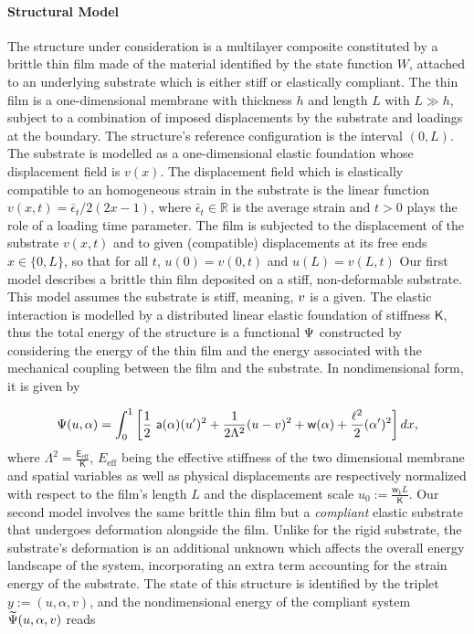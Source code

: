 \documentclass[10pt]{article}
\begin{document}
\paragraph{Structural Model}
The structure under consideration is a multilayer composite constituted by a brittle thin film  made of the material identified by the state function $W$, attached to an underlying substrate which is either {stiff} or elastically compliant. The thin film is a one-dimensional membrane with thickness $h$ and length $L$ with $L\gg h$, subject to a combination of imposed displacements by the substrate and loadings at the boundary. The structure's reference configuration is the interval $(0, L)$.
%
The substrate is modelled as a one-dimensional elastic foundation whose displacement field is $v(x)$.
%
The displacement field which is elastically compatible to an homogeneous strain in the substrate is the linear function $v(x, t) = \bar\epsilon_t/2 (2x-1)$, where {$\bar\epsilon_t\in \mathbb R$} is the {average} strain and $t>0$ plays the role of a loading time parameter.
%
%
The film is subjected to {the displacement of the substrate} $v(x, t)$  and to given (compatible) displacements at its free ends $x \in \{0, L\}$, so that for all $t$, $u(0)=v(0, t)$ and $u(L)=v(L, t)$
%
Our first model describes a brittle thin film deposited on a stiff, non-deformable substrate. This model assumes the substrate is {stiff}, meaning, $v$ is a given. The elastic interaction is modelled by a distributed linear elastic foundation of stiffness $\mathsf{K}$, thus
%
the total energy of the structure is a functional $\Psi$ constructed by considering the energy of the thin film and the energy associated with  the mechanical coupling between the film and the substrate. In nondimensional form, it is given by

\begin{equation}
    \label{def:energy_stiff}
    \Psi( u, \alpha) = \int_{0}^{1} \left[ \frac{1}{2} \ \soften(\alpha)(u')^2
        + \frac{1}{2 \elastell^2} (u-\subsu)^2
        + \homogdiss(\alpha) + \frac{\damagell^2}{2}(\alpha')^2
        \right] dx,
\end{equation}
where $\Lambda^2 = \frac{\mathsf E_{\text{eff}}}{\mathsf{K}}$, $E_{\text{eff}}$ being the effective stiffness of the two dimensional {membrane} {and spatial variables as well as physical displacements are respectively normalized with respect to the film's length $L$ and the displacement scale $u_0 := \frac{\mathsf{w_1}L}{\mathsf{K}}$}.
Our second model involves the same brittle thin film but a \emph{compliant} elastic substrate that undergoes deformation alongside the film. Unlike for the rigid substrate, the substrate's deformation is an additional unknown which affects the overall energy landscape of the system, incorporating an extra term accounting for the strain energy of the substrate.
The state of this structure is identified by the triplet $y:=(u, \alpha, v)$, and the nondimensional energy of the compliant system  $\widetilde\Psi( u, \alpha, v)$ reads
\end{document}
